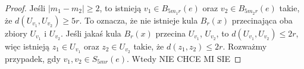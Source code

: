 \begin{proof}
  Jeśli $|m_1-m_2|\geq 2$, to istnieją $v_1\in B_{5m_1r}(e)$ oraz $v_2\in B_{5m_2r}(e)$ takie, że $d(U_{v_1}, U_{v_2})\geq 5r$. To oznacza, że nie istnieje kula $B_r(x)$ przecinająca oba zbiory $U_{v_1}$ i $U_{v_2}$. Jeśli jakaś kula $B_r(x)$ przecina $U_{v_1}$, $U_{v_2}$, to $d(U_{v_1}, U_{v_2})\leq 2r$, więc istnieją $z_1\in U_{v_1}$ oraz $z_2\in U_{v_2}$ takie, że $d(z_1,z_2)\leq 2r$. Rozważmy przypadek, gdy $v_1,v_2\in S_{5mr}(e)$. Wtedy 
  {\large\color{red}NIE CHCE MI SIE}


\end{proof}


